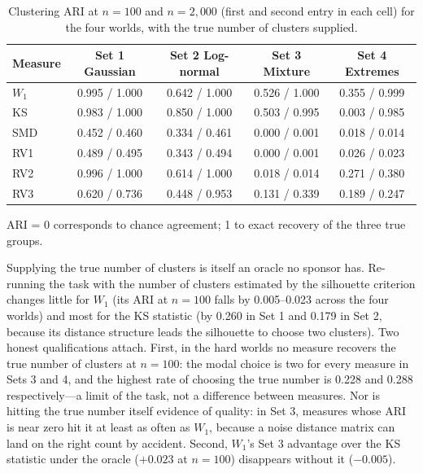 \documentclass[AMA,Times1COL]{WileyNJDv5}
\begin{document}
\begin{table}[ht]
\centering
\caption{Clustering ARI at $n = 100$ and $n = 2{,}000$ (first and second entry in each cell) for the four worlds, with the true number of clusters supplied.\label{tab:study2_ari}}
\begin{tabular}{lcccc}
\toprule
\textbf{Measure} & \textbf{Set 1 Gaussian} & \textbf{Set 2 Log-normal} & \textbf{Set 3 Mixture} & \textbf{Set 4 Extremes} \\
\midrule
$W_1$ & 0.995 / 1.000 & 0.642 / 1.000 & 0.526 / 1.000 & 0.355 / 0.999 \\
KS    & 0.983 / 1.000 & 0.850 / 1.000 & 0.503 / 0.995 & 0.003 / 0.985 \\
SMD   & 0.452 / 0.460 & 0.334 / 0.461 & 0.000 / 0.001 & 0.018 / 0.014 \\
RV1   & 0.489 / 0.495 & 0.343 / 0.494 & 0.000 / 0.001 & 0.026 / 0.023 \\
RV2   & 0.996 / 1.000 & 0.614 / 1.000 & 0.018 / 0.014 & 0.271 / 0.380 \\
RV3   & 0.620 / 0.736 & 0.448 / 0.953 & 0.131 / 0.339 & 0.189 / 0.247 \\
\bottomrule
\end{tabular}
\begin{tablenotes}
\item ARI = 0 corresponds to chance agreement; 1 to exact recovery of the three true groups.
\end{tablenotes}
\end{table}

Supplying the true number of clusters is itself an oracle no sponsor has. Re-running the task with the number of clusters estimated by the silhouette criterion changes little for $W_1$ (its ARI at $n = 100$ falls by 0.005--0.023 across the four worlds) and most for the KS statistic (by 0.260 in Set 1 and 0.179 in Set 2, because its distance structure leads the silhouette to choose two clusters). Two honest qualifications attach. First, in the hard worlds no measure recovers the true number of clusters at $n = 100$: the modal choice is two for every measure in Sets 3 and 4, and the highest rate of choosing the true number is 0.228 and 0.288 respectively---a limit of the task, not a difference between measures. Nor is hitting the true number itself evidence of quality: in Set 3, measures whose ARI is near zero hit it at least as often as $W_1$, because a noise distance matrix can land on the right count by accident. Second, $W_1$'s Set 3 advantage over the KS statistic under the oracle ($+0.023$ at $n = 100$) disappears without it ($-0.005$).
\end{document}
